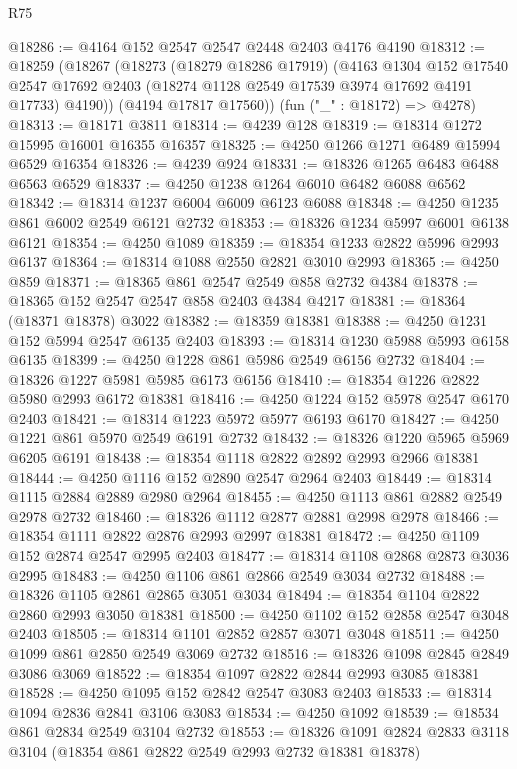 \begin{lexlean}{R75}
\begin{coremodule}
@18286 := @4164 @152 @2547 @2547 @2448 @2403 @4176 @4190
@18312 := @18259
    (@18267
      (@18273
        (@18279 @18286 @17919)
        (@4163
          @1304
          @152
          @17540
          @2547
          @17692
          @2403
          (@18274 @1128 @2549 @17539 @3974 @17692 @4191 @17733)
          @4190))
      (@4194 @17817 @17560))
    (fun ("_" : @18172) => @4278)
@18313 := @18171 @3811
@18314 := @4239 @128
@18319 := @18314 @1272 @15995 @16001 @16355 @16357
@18325 := @4250 @1266 @1271 @6489 @15994 @6529 @16354
@18326 := @4239 @924
@18331 := @18326 @1265 @6483 @6488 @6563 @6529
@18337 := @4250 @1238 @1264 @6010 @6482 @6088 @6562
@18342 := @18314 @1237 @6004 @6009 @6123 @6088
@18348 := @4250 @1235 @861 @6002 @2549 @6121 @2732
@18353 := @18326 @1234 @5997 @6001 @6138 @6121
@18354 := @4250 @1089
@18359 := @18354 @1233 @2822 @5996 @2993 @6137
@18364 := @18314 @1088 @2550 @2821 @3010 @2993
@18365 := @4250 @859
@18371 := @18365 @861 @2547 @2549 @858 @2732 @4384
@18378 := @18365 @152 @2547 @2547 @858 @2403 @4384 @4217
@18381 := @18364 (@18371 @18378) @3022
@18382 := @18359 @18381
@18388 := @4250 @1231 @152 @5994 @2547 @6135 @2403
@18393 := @18314 @1230 @5988 @5993 @6158 @6135
@18399 := @4250 @1228 @861 @5986 @2549 @6156 @2732
@18404 := @18326 @1227 @5981 @5985 @6173 @6156
@18410 := @18354 @1226 @2822 @5980 @2993 @6172 @18381
@18416 := @4250 @1224 @152 @5978 @2547 @6170 @2403
@18421 := @18314 @1223 @5972 @5977 @6193 @6170
@18427 := @4250 @1221 @861 @5970 @2549 @6191 @2732
@18432 := @18326 @1220 @5965 @5969 @6205 @6191
@18438 := @18354 @1118 @2822 @2892 @2993 @2966 @18381
@18444 := @4250 @1116 @152 @2890 @2547 @2964 @2403
@18449 := @18314 @1115 @2884 @2889 @2980 @2964
@18455 := @4250 @1113 @861 @2882 @2549 @2978 @2732
@18460 := @18326 @1112 @2877 @2881 @2998 @2978
@18466 := @18354 @1111 @2822 @2876 @2993 @2997 @18381
@18472 := @4250 @1109 @152 @2874 @2547 @2995 @2403
@18477 := @18314 @1108 @2868 @2873 @3036 @2995
@18483 := @4250 @1106 @861 @2866 @2549 @3034 @2732
@18488 := @18326 @1105 @2861 @2865 @3051 @3034
@18494 := @18354 @1104 @2822 @2860 @2993 @3050 @18381
@18500 := @4250 @1102 @152 @2858 @2547 @3048 @2403
@18505 := @18314 @1101 @2852 @2857 @3071 @3048
@18511 := @4250 @1099 @861 @2850 @2549 @3069 @2732
@18516 := @18326 @1098 @2845 @2849 @3086 @3069
@18522 := @18354 @1097 @2822 @2844 @2993 @3085 @18381
@18528 := @4250 @1095 @152 @2842 @2547 @3083 @2403
@18533 := @18314 @1094 @2836 @2841 @3106 @3083
@18534 := @4250 @1092
@18539 := @18534 @861 @2834 @2549 @3104 @2732
@18553 := @18326
    @1091
    @2824
    @2833
    @3118
    @3104
    (@18354 @861 @2822 @2549 @2993 @2732 @18381 @18378)

\end{coremodule}
\end{lexlean}
